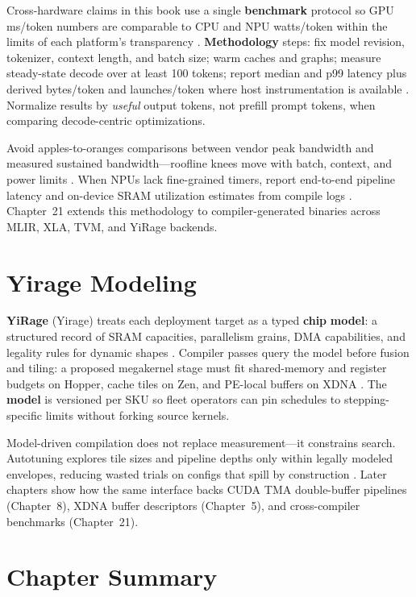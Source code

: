 Cross-hardware claims in this book use a single \textbf{benchmark} protocol so GPU ms/token numbers are comparable to CPU and NPU watts/token within the limits of each platform's transparency \citep{patel2025llminference,memoryfloor2026}.
\textbf{Methodology} steps: fix model revision, tokenizer, context length, and batch size; warm caches and graphs; measure steady-state decode over at least 100 tokens; report median and p99 latency plus derived bytes/token and launches/token where host instrumentation is available \citep{taxbreak2026,memoryfloor2026}.
Normalize results by \emph{useful} output tokens, not prefill prompt tokens, when comparing decode-centric optimizations.

Avoid apples-to-oranges comparisons between vendor peak bandwidth and measured sustained bandwidth---roofline knees move with batch, context, and power limits \citep{memoryfloor2026}.
When NPUs lack fine-grained timers, report end-to-end pipeline latency and on-device SRAM utilization estimates from compile logs \citep{amd2024xdna}.
Chapter~21 extends this methodology to compiler-generated binaries across MLIR, XLA, TVM, and YiRage backends.

\section{Yirage Modeling}
\label{sec:yirage_modeling}

\textbf{YiRage} (Yirage) treats each deployment target as a typed \textbf{chip} \textbf{model}: a structured record of SRAM capacities, parallelism grains, DMA capabilities, and legality rules for dynamic shapes \citep{amd2024xdna,nvidia2022hopper}.
Compiler passes query the model before fusion and tiling: a proposed megakernel stage must fit shared-memory and register budgets on Hopper, cache tiles on Zen, and PE-local buffers on XDNA \citep{memoryfloor2026,amd2024aie}.
The \textbf{model} is versioned per SKU so fleet operators can pin schedules to stepping-specific limits without forking source kernels.

Model-driven compilation does not replace measurement---it constrains search.
Autotuning explores tile sizes and pipeline depths only within legally modeled envelopes, reducing wasted trials on configs that spill by construction \citep{patel2025llminference}.
Later chapters show how the same interface backs CUDA TMA double-buffer pipelines (Chapter~8), XDNA buffer descriptors (Chapter~5), and cross-compiler benchmarks (Chapter~21).

\section{Chapter Summary}
\label{sec:ch03_summary}

